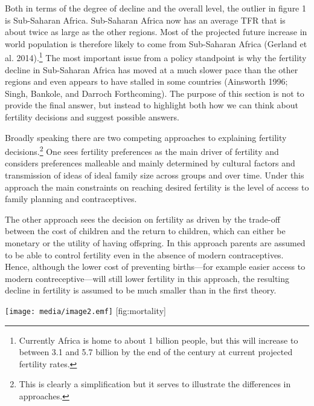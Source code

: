 \documentclass[]{article}
\begin{document}
Both in terms of the degree of decline and the overall level, the outlier in figure 1 is Sub-Saharan Africa. Sub-Saharan Africa now has an average TFR that is about twice as large as the other regions. Most of the projected future increase in world population is therefore likely to come from Sub-Saharan Africa (Gerland et al. 2014).\footnote{Currently Africa is home to about 1 billion people, but this will increase to between 3.1 and 5.7 billion by the end of the century at current projected fertility rates.} The most important issue from a policy standpoint is why the fertility decline in Sub-Saharan Africa has moved at a much slower pace than the other regions and even appears to have stalled in some countries (Ainsworth 1996; Singh, Bankole, and Darroch Forthcoming). The purpose of this section is not to provide the final answer, but instead to highlight both how we can think about fertility decisions and suggest possible answers.

Broadly speaking there are two competing approaches to explaining fertility decisions.\footnote{This is clearly a simplification but it serves to illustrate the differences in approaches.} One sees fertility preferences as the main driver of fertility and considers preferences malleable and mainly determined by cultural factors and transmission of ideas of ideal family size across groups and over time. Under this approach the main constraints on reaching desired fertility is the level of access to family planning and contraceptives.

The other approach sees the decision on fertility as driven by the trade-off between the cost of children and the return to children, which can either be monetary or the utility of having offspring. In this approach parents are assumed to be able to control fertility even in the absence of modern contraceptives. Hence, although the lower cost of preventing births---for example easier access to modern contreceptive---will still lower fertility in this approach, the resulting decline in fertility is assumed to be much smaller than in the first theory.

\texttt{[image: media/image2.emf]} {[}fig:mortality{]}
\end{document}
